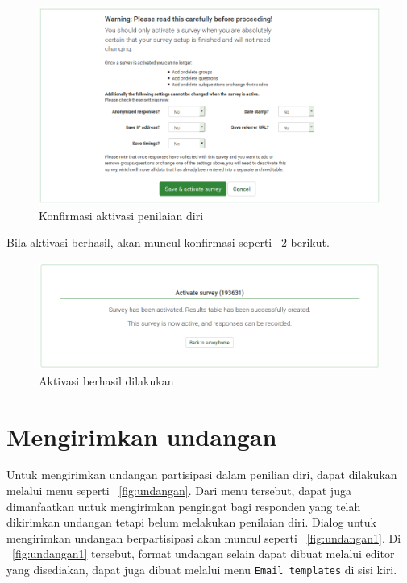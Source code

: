 \begin{figure}
  \begin{center}
    \includegraphics[scale=.35]{pics/konfirmasiAktivasi.png}
    \caption{Konfirmasi aktivasi penilaian diri}
    \label{fig:konfirmasiAktivasi}
  \end{center}
\end{figure}

Bila aktivasi berhasil, akan muncul konfirmasi seperti \figurename~\ref{fig:aktivasiBerhasil} berikut.

\begin{figure}
  \begin{center}
    \includegraphics[scale=.5]{pics/aktivasiBerhasil.png}
    \caption{Aktivasi berhasil dilakukan}
    \label{fig:aktivasiBerhasil}
  \end{center}
\end{figure}

\section{Mengirimkan undangan}
Untuk mengirimkan undangan partisipasi dalam penilian diri, dapat dilakukan melalui menu seperti \figurename~\ref{fig:undangan}. Dari menu tersebut, dapat juga dimanfaatkan untuk mengirimkan pengingat bagi responden yang telah dikirimkan undangan tetapi belum melakukan penilaian diri. Dialog untuk mengirimkan undangan berpartisipasi akan muncul seperti \figurename~\ref{fig:undangan1}. Di \figurename~\ref{fig:undangan1} tersebut, format undangan selain dapat dibuat melalui editor yang disediakan, dapat juga dibuat melalui menu \texttt{Email templates} di sisi kiri.

